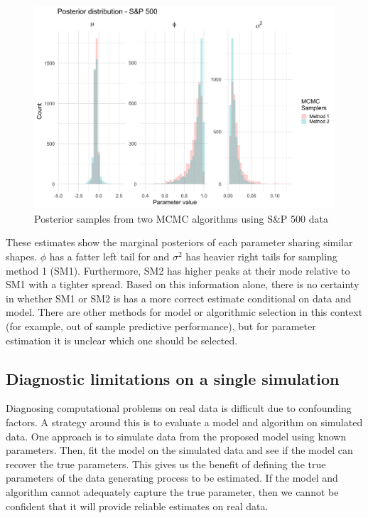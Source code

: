\documentclass[12pt, a4paper]{article}
\begin{document}
    \begin{figure}[h]
        \centering
        \includegraphics[scale=0.1]{motivating_example/real_data_ex.png}
        \caption{Posterior samples from two MCMC algorithms using S\&P 500 data}
    \end{figure}

    These estimates show the marginal posteriors of each parameter sharing similar shapes. $\phi$  has a fatter left tail for and $\sigma^2$ has heavier right tails for sampling method 1 (SM1). Furthermore, SM2 has higher peaks at their mode relative to SM1 with a tighter spread. Based on this information alone, there is no certainty in whether SM1 or SM2 is has a more correct estimate conditional on data and model. There are other methods for model or algorithmic selection in this context (for example, out of sample predictive performance), but for parameter estimation it is unclear which one should be selected. 

\subsection{Diagnostic limitations on a single simulation}
    Diagnosing computational problems on real data is difficult due to confounding factors. A strategy around this is to evaluate a model and algorithm on simulated data. One approach is to simulate data from the proposed model using known parameters. Then, fit the model on the simulated data and see if the model can recover the true parameters. This gives us the benefit of defining the true parameters of the data generating process to be estimated. If the model and algorithm cannot adequately capture the true parameter, then we cannot be confident that it will provide reliable estimates on real data.
\end{document}
